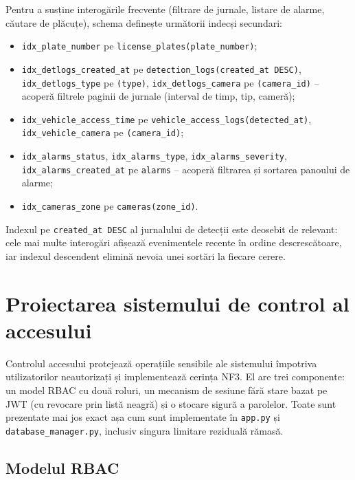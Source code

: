 \documentclass[../../main.tex]{subfiles}
\begin{document}
Pentru a susține interogările frecvente (filtrare de jurnale, listare de alarme, căutare de plăcuțe), schema definește următorii indecși secundari:
\begin{itemize}
    \item \texttt{idx\_plate\_number} pe \texttt{license\_plates(plate\_number)};
    \item \texttt{idx\_detlogs\_created\_at} pe \texttt{detection\_logs(created\_at DESC)}, \linebreak \texttt{idx\_detlogs\_type} pe \texttt{(type)}, \texttt{idx\_detlogs\_camera} pe \texttt{(camera\_id)} -- acoperă filtrele paginii de jurnale (interval de timp, tip, cameră);
    \item \texttt{idx\_vehicle\_access\_time} pe \texttt{vehicle\_access\_logs(detected\_at)}, \linebreak \texttt{idx\_vehicle\_camera} pe \texttt{(camera\_id)};
    \item \texttt{idx\_alarms\_status}, \texttt{idx\_alarms\_type}, \texttt{idx\_alarms\_severity}, \texttt{idx\_\linebreak alarms\_created\_at} pe \texttt{alarms} -- acoperă filtrarea și sortarea panoului de alarme;
    \item \texttt{idx\_cameras\_zone} pe \texttt{cameras(zone\_id)}.
\end{itemize}
Indexul pe \texttt{created\_at DESC} al jurnalului de detecții este deosebit de relevant: cele mai multe interogări afișează evenimentele recente în ordine descrescătoare, iar indexul descendent elimină nevoia unei sortări la fiecare cerere.

\section{Proiectarea sistemului de control al accesului}
\label{sec:rbac}

Controlul accesului protejează operațiile sensibile ale sistemului împotriva utilizatorilor neautorizați și implementează cerința NF3. El are trei componente: un model RBAC cu două roluri, un mecanism de sesiune fără stare bazat pe JWT (cu revocare prin listă neagră) și o stocare sigură a parolelor. Toate sunt prezentate mai jos exact așa cum sunt implementate în \texttt{app.py} și \texttt{database\_manager.\linebreak py}, inclusiv singura limitare reziduală rămasă.

\subsection{Modelul RBAC}
\end{document}

